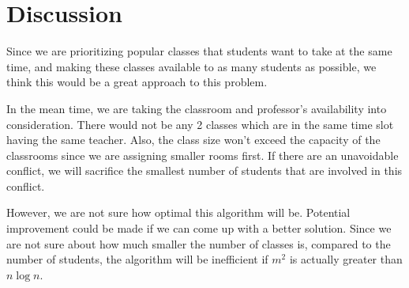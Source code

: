 \documentclass[11pt, oneside]{article}   	%
\begin{document}
\section{Discussion}
Since we are prioritizing popular classes that students want to take at the same time, and making these classes available to as many students as possible, we think this would be a great approach to this problem.

In the mean time, we are taking the classroom and professor's availability into consideration. There would not be any 2 classes which are in the same time slot having the same teacher. Also, the class size won't exceed the capacity of the classrooms since we are assigning smaller rooms first. If there are an unavoidable conflict, we will sacrifice the smallest number of students that are involved in this conflict.

However, we are not sure how optimal this algorithm will be. Potential improvement could be made if we can come up with a better solution. Since we are not sure about how much smaller the number of classes is, compared to the number of students, the algorithm will be inefficient if $m^2$ is actually greater than $n \log n$.
\end{document}
